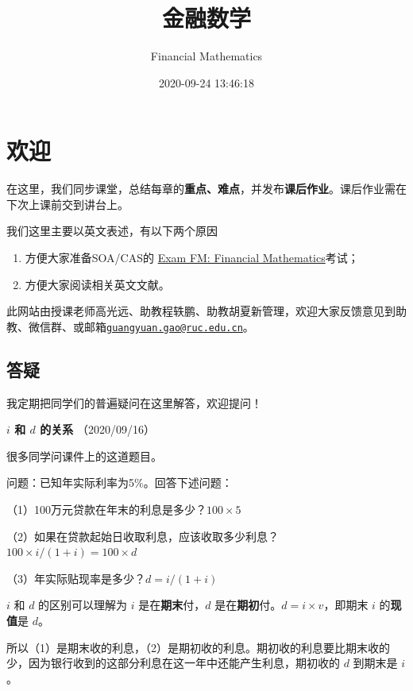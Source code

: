 \documentclass[
]{book}
\title{金融数学}
\author{Financial Mathematics}
\date{2020-09-24 13:46:18}
\begin{document}
\maketitle

{
\setcounter{tocdepth}{1}
\tableofcontents
}
\hypertarget{ux6b22ux8fce}{%
\chapter*{欢迎}\label{ux6b22ux8fce}}

在这里，我们同步课堂，总结每章的\textbf{重点、难点}，并发布\textbf{课后作业}。课后作业需在下次上课前交到讲台上。

我们这里主要以英文表述，有以下两个原因

\begin{enumerate}
\def\labelenumi{\arabic{enumi}.}
\item
  方便大家准备SOA/CAS的 \href{https://www.soa.org/education/exam-req/edu-exam-fm-detail/}{Exam FM: Financial Mathematics}考试；
\item
  方便大家阅读相关英文文献。
\end{enumerate}

此网站由授课老师高光远、助教程轶鹏、助教胡夏新管理，欢迎大家反馈意见到助教、微信群、或邮箱\href{mailto:guangyuan.gao@ruc.edu.cn}{\nolinkurl{guangyuan.gao@ruc.edu.cn}}。

\hypertarget{ux7b54ux7591}{%
\section*{答疑}\label{ux7b54ux7591}}

我定期把同学们的普遍疑问在这里解答，欢迎提问！

\textbf{\(i\) 和 \(d\) 的关系} （2020/09/16）

很多同学问课件上的这道题目。

问题：已知年实际利率为5\%。回答下述问题：

（1）100万元贷款在年末的利息是多少？\(100\times5%
\)

（2）如果在贷款起始日收取利息，应该收取多少利息？\(100\times i/(1+i)=100\times d\)

（3）年实际贴现率是多少？\(d=i/(1+i)\)

\(i\) 和 \(d\) 的区别可以理解为 \(i\) 是在\textbf{期末}付，\(d\) 是在\textbf{期初}付。\(d=i\times v\)，即期末 \(i\) 的\textbf{现值}是 \(d\)。

所以（1）是期末收的利息，（2）是期初收的利息。期初收的利息要比期末收的少，因为银行收到的这部分利息在这一年中还能产生利息，期初收的 \(d\) 到期末是 \(i\)。
\end{document}
